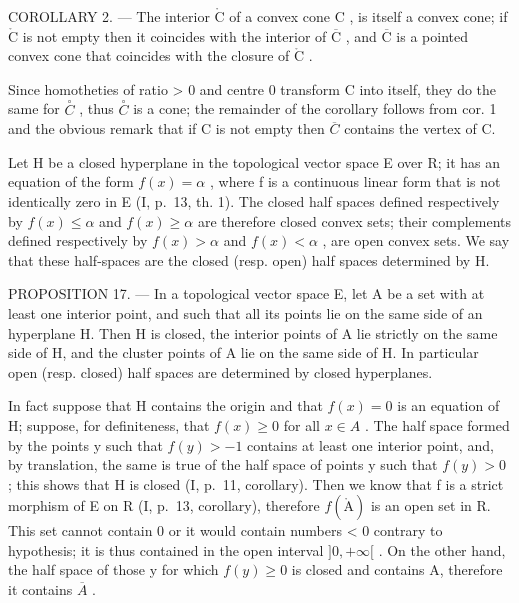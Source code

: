 COROLLARY 2. --- The interior \(\mathring{\mathrm{C}}\) of a convex cone \(\mathrm{C}\) , is itself a convex cone; if \(\mathring{\mathrm{C}}\) is not empty then it coincides with the interior of \(\overline{\mathrm{C}}\) , and \(\overline{\mathrm{C}}\) is a pointed convex cone that coincides with the closure of \(\mathring{\mathrm{C}}\) .

Since homotheties of ratio \textgreater{} 0 and centre 0 transform C into itself, they do the same for \(\overset{\circ}{C}\) , thus \(\overset{\circ}{C}\) is a cone; the remainder of the corollary follows from cor. 1 and the obvious remark that if C is not empty then \(\overline{C}\) contains the vertex of C.

Let H be a closed hyperplane in the topological vector space E over R; it has an equation of the form \(f(x) = \alpha\) , where f is a continuous linear form that is not identically zero in E (I, p.~13, th. 1). The closed half spaces defined respectively by \(f(x) \leqslant \alpha\) and \(f(x) \geqslant \alpha\) are therefore closed convex sets; their complements defined respectively by \(f(x) > \alpha\) and \(f(x) < \alpha\) , are open convex sets. We say that these half-spaces are the closed (resp. open) half spaces determined by H.

PROPOSITION 17. --- In a topological vector space E, let A be a set with at least one interior point, and such that all its points lie on the same side of an hyperplane H. Then H is closed, the interior points of A lie strictly on the same side of H, and the cluster points of A lie on the same side of H. In particular open (resp. closed) half spaces are determined by closed hyperplanes.

In fact suppose that H contains the origin and that \(f(x) = 0\) is an equation of H; suppose, for definiteness, that \(f(x) \geqslant 0\) for all \(x \in A\) . The half space formed by the points y such that \(f(y) > -1\) contains at least one interior point, and, by translation, the same is true of the half space of points y such that \(f(y) > 0\) ; this shows that H is closed (I, p.~11, corollary). Then we know that f is a strict morphism of E on R (I, p.~13, corollary), therefore \(f(\mathring{\mathrm{A}})\) is an open set in R. This set cannot contain 0 or it would contain numbers \textless{} 0 contrary to hypothesis; it is thus contained in the open interval \(\bigg]0, +\infty[\) . On the other hand, the half space of those y for which \(f(y) \geqslant 0\) is closed and contains A, therefore it contains \(\overline{A}\) .

